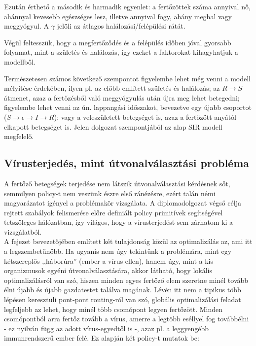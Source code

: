     Ezután érthető a második és harmadik egyenlet: a fertőzöttek száma annyival nő, ahánnyal kevesebb egészséges lesz, illetve annyival fogy, ahány meghal vagy meggyógyul. A $\gamma$ jelöli az átlagos halálozási/felépülési rátát.

    Végül feltesszük, hogy a megfertőződés és a felépülés időben jóval gyorsabb folyamat, mint a születés és halálozás, így ezeket a faktorokat kihagyhatjuk a modellből.

    \begin{note}
      Természetesen számos következő szempontot figyelembe lehet még venni a modell mélyítése érdekében, ilyen pl. az előbb említett születés és halálozás; az $R \rightarrow S$ átmenet, azaz a fertőzésből való meggyógyulás után újra meg lehet betegedni; figyelembe lehet venni az ún. lappangási időszakot, bevezetve egy újabb csoportot ($S \rightarrow \epsilon \rightarrow I \rightarrow R$); vagy a veleszületett betegséget is, azaz a fertőzött anyától elkapott betegséget is.\newline  
      Jelen dolgozat szempontjából az alap SIR modell megfelelő.
    \end{note}

    \subsection{Vírusterjedés, mint útvonalválasztási probléma}

    A fertőző betegségek terjedése nem látszik útvonalválasztási kérdésnek sőt, semmilyen policy-t nem veszünk észre első ránézésre, ezért talán némi magyarázatot igényel a problémakör vizsgálata. A diplomadolgozat végső célja rejtett szabályok felismerése előre definiált policy primitívek segítségével tetszőleges hálózatban, így világos, hogy a vírusterjedést sem zárhatom ki a vizsgálatból.\\

    A fejezet bevezetőjében említett két tulajdonság közül az optimalizálás az, ami itt a legszembetűnőbb. Ha ugyanis nem úgy tekintünk a problémára, mint egy kétszereplős ,,háborúra'' (ember a vírus ellen), hanem úgy, mint a kis organizmusok egyéni útvonalválasztására, akkor látható, hogy lokális optimalizálásról van szó, hiszen minden egyes fertőző elem szeretne minél tovább élni újabb és újabb gazdatestet találva magának. Lévén itt nem a tipikus több lépésen keresztüli pont-pont routing-ról van szó, globális optimalizálási feladat legfeljebb az lehet, hogy minél több csomópont legyen fertőzött. Minden csomópontból arra fertőz tovább a vírus, amerre a legtöbb eséllyel fog továbbélni - ez nyilván függ az adott vírus-egyedtől is -, azaz pl. a leggyengébb immunrendszerű ember felé. Ez alapján két policy-t mutatok be:

